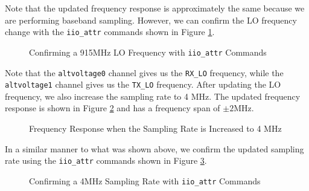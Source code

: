 \documentclass{article}
\begin{document}
Note that the updated frequency response is approximately the same because we are performing baseband sampling. However, we can confirm the LO frequency change with the \texttt{iio\_attr} commands shown in Figure \ref{fig::iio_attr_confirm_lo_frequency}.

\begin{figure}[H]
	\centerline{}
	\caption{Confirming a 915MHz LO Frequency with \texttt{iio\_attr} Commands}
	\label{fig::iio_attr_confirm_lo_frequency}
\end{figure}

Note that the \texttt{altvoltage0} channel gives us the \texttt{RX\_LO} frequency, while the \texttt{altvoltage1} channel gives us the \texttt{TX\_LO} frequency. After updating the LO frequency, we also increase the sampling rate to 4 MHz. The updated frequency response is shown in Figure \ref{fig::gnu_radio_loopback_generic_iio_4MSPS} and has a frequency span of $\pm 2 \text{MHz}$.

\begin{figure}[H]
	\centerline{}
	\caption{Frequency Response when the Sampling Rate is Increased to 4 MHz}
	\label{fig::gnu_radio_loopback_generic_iio_4MSPS}
\end{figure}

In a similar manner to what was shown above, we confirm the updated sampling rate using the \texttt{iio\_attr} commands shown in Figure \ref{fig::iio_attr_confirm_sampling_rate}.

\begin{figure}[H]
	\centerline{}
	\caption{Confirming a 4MHz Sampling Rate with \texttt{iio\_attr} Commands}
	\label{fig::iio_attr_confirm_sampling_rate}
\end{figure}
\end{document}
